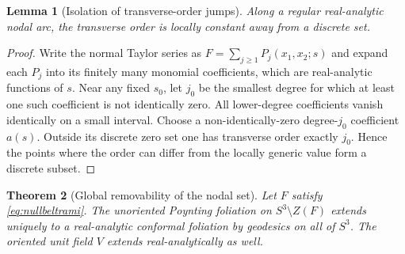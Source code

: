 \documentclass[aps,prd,reprint,nofootinbib,superscriptaddress]{revtex4-2}
\newtheorem{theorem}{Theorem}[section]
\newtheorem{lemma}[theorem]{Lemma}
\theoremstyle{definition}
\theoremstyle{remark}
\begin{document}
\begin{lemma}[Isolation of transverse-order jumps]
\label{lem:orderjumps}
Along a regular real-analytic nodal arc, the transverse order is locally constant away from a discrete set.
\end{lemma}

\begin{proof}
Write the normal Taylor series as $F=\sum_{j\ge1}P_j(x_1,x_2;s)$ and expand each $P_j$ into its finitely many monomial coefficients, which are real-analytic functions of $s$. Near any fixed $s_0$, let $j_0$ be the smallest degree for which at least one such coefficient is not identically zero. All lower-degree coefficients vanish identically on a small interval. Choose a non-identically-zero degree-$j_0$ coefficient $a(s)$. Outside its discrete zero set one has transverse order exactly $j_0$. Hence the points where the order can differ from the locally generic value form a discrete subset.
\end{proof}

\begin{theorem}[Global removability of the nodal set]
\label{thm:globalremoval}
Let $F$ satisfy \eqref{eq:nullbeltrami}. The unoriented Poynting foliation on $S^3\setminus Z(F)$ extends uniquely to a real-analytic conformal foliation by geodesics on all of $S^3$. The oriented unit field $V$ extends real-analytically as well.
\end{theorem}
\end{document}
